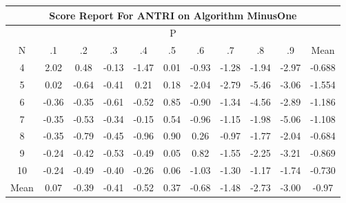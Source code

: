 \documentclass[11pt,a4paper]{report}
\begin{document}
\begin{longtable}{ | c || c | c | c | c | c | c | c | c | c || c |}
\hline
\multicolumn{11}{|c|}{ Score Report For ANTRI on Algorithm MinusOne} \\
\hline
\multicolumn{11}{|c|}{ P } \\
\hline
N & .1 & .2 & .3 & .4 & .5 & .6 & .7 & .8 & .9 & Mean\\
 \hline
 \hline
 \endhead
  4 &  \cellcolor[HTML]{CFCFFF} 2.02 &  \cellcolor[HTML]{EFEFFF} 0.48 &  \cellcolor[HTML]{FFFFFF} -0.13 &  \cellcolor[HTML]{FFD7D7} -1.47 &  \cellcolor[HTML]{FFFFFF} 0.01 &  \cellcolor[HTML]{FFE7E7} -0.93 &  \cellcolor[HTML]{FFDFDF} -1.28 &  \cellcolor[HTML]{FFCFCF} -1.94 &  \cellcolor[HTML]{FFB7B7} -2.97 & -0.688 \\
  5 &  \cellcolor[HTML]{FFFFFF} 0.02 &  \cellcolor[HTML]{FFEFEF} -0.64 &  \cellcolor[HTML]{FFF7F7} -0.41 &  \cellcolor[HTML]{F7F7FF} 0.21 &  \cellcolor[HTML]{F7F7FF} 0.18 &  \cellcolor[HTML]{FFCFCF} -2.04 &  \cellcolor[HTML]{FFB7B7} -2.79 &  \cellcolor[HTML]{FF7878} -5.46 &  \cellcolor[HTML]{FFAFAF} -3.06 & -1.554 \\
  6 &  \cellcolor[HTML]{FFF7F7} -0.36 &  \cellcolor[HTML]{FFF7F7} -0.35 &  \cellcolor[HTML]{FFEFEF} -0.61 &  \cellcolor[HTML]{FFEFEF} -0.52 &  \cellcolor[HTML]{E7E7FF} 0.85 &  \cellcolor[HTML]{FFE7E7} -0.90 &  \cellcolor[HTML]{FFDFDF} -1.34 &  \cellcolor[HTML]{FF8F8F} -4.56 &  \cellcolor[HTML]{FFB7B7} -2.89 & -1.186 \\
  7 &  \cellcolor[HTML]{FFF7F7} -0.35 &  \cellcolor[HTML]{FFEFEF} -0.53 &  \cellcolor[HTML]{FFF7F7} -0.34 &  \cellcolor[HTML]{FFFFFF} -0.15 &  \cellcolor[HTML]{EFEFFF} 0.54 &  \cellcolor[HTML]{FFE7E7} -0.96 &  \cellcolor[HTML]{FFDFDF} -1.15 &  \cellcolor[HTML]{FFCFCF} -1.98 &  \cellcolor[HTML]{FF8080} -5.06 & -1.108 \\
  8 &  \cellcolor[HTML]{FFF7F7} -0.35 &  \cellcolor[HTML]{FFEFEF} -0.79 &  \cellcolor[HTML]{FFF7F7} -0.45 &  \cellcolor[HTML]{FFE7E7} -0.96 &  \cellcolor[HTML]{E7E7FF} 0.90 &  \cellcolor[HTML]{F7F7FF} 0.26 &  \cellcolor[HTML]{FFE7E7} -0.97 &  \cellcolor[HTML]{FFCFCF} -1.77 &  \cellcolor[HTML]{FFCFCF} -2.04 & -0.684 \\
  9 &  \cellcolor[HTML]{FFF7F7} -0.24 &  \cellcolor[HTML]{FFF7F7} -0.42 &  \cellcolor[HTML]{FFEFEF} -0.53 &  \cellcolor[HTML]{FFEFEF} -0.49 &  \cellcolor[HTML]{FFFFFF} 0.05 &  \cellcolor[HTML]{E7E7FF} 0.82 &  \cellcolor[HTML]{FFD7D7} -1.55 &  \cellcolor[HTML]{FFC7C7} -2.25 &  \cellcolor[HTML]{FFAFAF} -3.21 & -0.869 \\
  10 &  \cellcolor[HTML]{FFF7F7} -0.24 &  \cellcolor[HTML]{FFEFEF} -0.49 &  \cellcolor[HTML]{FFF7F7} -0.40 &  \cellcolor[HTML]{FFF7F7} -0.26 &  \cellcolor[HTML]{FFFFFF} 0.06 &  \cellcolor[HTML]{FFE7E7} -1.03 &  \cellcolor[HTML]{FFDFDF} -1.30 &  \cellcolor[HTML]{FFDFDF} -1.17 &  \cellcolor[HTML]{FFD7D7} -1.74 & -0.730 \\
 \hline
 \hline
Mean &  \cellcolor[HTML]{FFFFFF} 0.07 &  \cellcolor[HTML]{FFF7F7} -0.39 &  \cellcolor[HTML]{FFF7F7} -0.41 &  \cellcolor[HTML]{FFEFEF} -0.52 &  \cellcolor[HTML]{F7F7FF} 0.37 &  \cellcolor[HTML]{FFEFEF} -0.68 &  \cellcolor[HTML]{FFD7D7} -1.48 &  \cellcolor[HTML]{FFB7B7} -2.73 &  \cellcolor[HTML]{FFB7B7} -3.00 &  \cellcolor[HTML]{FFE7E7} -0.97
\end{longtable}
\end{document}

